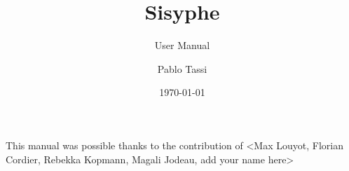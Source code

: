 \documentclass[Sisyphe]{../../data/TelemacDoc} %
\begin{document}
\let\cleardoublepage\clearpage

\setlength\parindent{0pt}

\title{Sisyphe}
\subtitle{User Manual}
\author{Pablo Tassi}
\date{\today}
\maketitle
\clearpage



\newpage

\thispagestyle{empty}

\TelemacCopyright{}




\pagestyle{empty} %

\tableofcontents%


\pagestyle{fancy} %

\pagebreak
This manual was possible thanks to the contribution of <Max Louyot, Florian Cordier, Rebekka Kopmann, Magali Jodeau, add your name here>
\pagebreak



\end{document}
